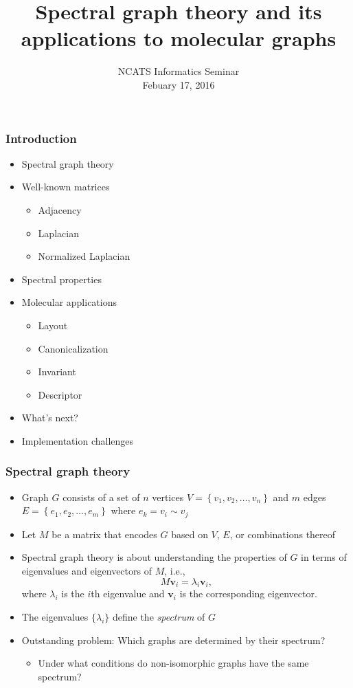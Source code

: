 \documentclass{beamer}
\title{Spectral graph theory and its\\
applications to molecular graphs}
\date[]%
{NCATS Informatics Seminar\\ Febuary 17, 2016}
\begin{document}
\begin{frame}
  \titlepage
\end{frame}

\begin{frame}
  \frametitle{Introduction}
  \begin{itemize}
  \item Spectral graph theory
  \item Well-known matrices
    \begin{itemize}
    \item Adjacency
    \item Laplacian
    \item Normalized Laplacian
    \end{itemize}
  \item Spectral properties
  \item Molecular applications
    \begin{itemize}
    \item Layout
    \item Canonicalization
    \item Invariant
    \item Descriptor
    \end{itemize}
  \item What's next?    
  \item Implementation challenges
  \end{itemize}
\end{frame}

\begin{frame}
  \frametitle{Spectral graph theory}
  \begin{itemize}
  \item Graph $G$ consists of a set of $n$ vertices $V =
    \left\{v_1,v_2,\ldots,v_n\right\}$ and $m$ edges $E =
    \left\{e_1,e_2,\ldots,e_m\right\}$ where  $e_k = v_i\sim v_j$
  \item Let $M$ be a matrix that encodes $G$ based on $V$, $E$, or
    combinations thereof
  \item Spectral graph theory is about understanding the properties
    of $G$ in terms of eigenvalues and eigenvectors of $M$, i.e.,
    \[ M\mathbf{v}_i = \lambda_i\mathbf{v}_i, \]
    where $\lambda_i$ is the $i$th eigenvalue and $\mathbf{v}_i$ is
    the corresponding eigenvector.
  \item The eigenvalues $\{\lambda_i\}$ define the \emph{spectrum} of $G$
  \item Outstanding problem: Which graphs are determined by their
    spectrum?
    \begin{itemize}
      \item Under what conditions do non-isomorphic graphs 
        have the same spectrum?
    \end{itemize}
  \end{itemize}
\end{frame}
\end{document}
